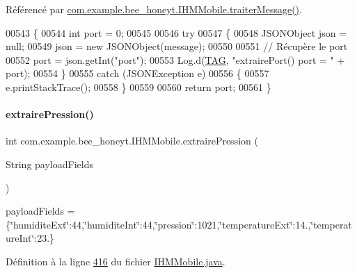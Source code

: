 Référencé par \hyperlink{_i_h_m_mobile_8java_source_l00374}{com.\+example.\+bee\+\_\+honeyt.\+I\+H\+M\+Mobile.\+traiter\+Message()}.


\begin{DoxyCode}
00543     \{
00544         \textcolor{keywordtype}{int} port = 0;
00545 
00546         \textcolor{keywordflow}{try}
00547         \{
00548             JSONObject json = null;
00549             json = \textcolor{keyword}{new} JSONObject(message);
00550 
00551             \textcolor{comment}{// Récupère le port}
00552             port = json.getInt(\textcolor{stringliteral}{"port"});
00553             Log.d(\hyperlink{classcom_1_1example_1_1bee__honeyt_1_1_i_h_m_mobile_a366987bf9bb2ed1010b2f967d4efa263}{TAG}, \textcolor{stringliteral}{"extrairePort() port = "} + port);
00554         \}
00555         \textcolor{keywordflow}{catch} (JSONException e)
00556         \{
00557             e.printStackTrace();
00558         \}
00559 
00560         \textcolor{keywordflow}{return} port;
00561     \}
\end{DoxyCode}
\mbox{\label{classcom_1_1example_1_1bee__honeyt_1_1_i_h_m_mobile_ad49ff3588da89162f21ca8e983a0fb4c}} 
\paragraph{\texorpdfstring{extraire\+Pression()}{extrairePression()}}
{\footnotesize\ttfamily int com.\+example.\+bee\+\_\+honeyt.\+I\+H\+M\+Mobile.\+extraire\+Pression (\begin{DoxyParamCaption}\item[{String}]{payload\+Fields }\end{DoxyParamCaption})\hspace{0.3cm}{\ttfamily [private]}}

payload\+Fields = \{\char`\"{}humidite\+Ext\char`\"{}\+:44,\char`\"{}humidite\+Int\char`\"{}\+:44,\char`\"{}pression\char`\"{}\+:1021,\char`\"{}temperature\+Ext\char`\"{}\+:14.,\char`\"{}temperature\+Int\char`\"{}\+:23.\}

Définition à la ligne \hyperlink{_i_h_m_mobile_8java_source_l00416}{416} du fichier \hyperlink{_i_h_m_mobile_8java_source}{I\+H\+M\+Mobile.\+java}.



